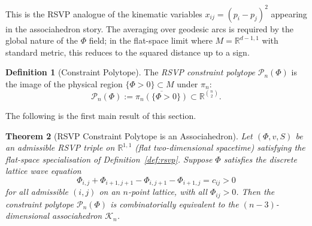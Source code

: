 \documentclass[12pt, oneside]{amsart}
\theoremstyle{plain}
\newtheorem{theorem}{Theorem}[section]
\theoremstyle{definition}
\newtheorem{definition}[theorem]{Definition}
\theoremstyle{remark}
\newcommand{\R}{\mathbb{R}}
\newcommand{\Assoc}{\mathcal{K}_n}
\begin{document}
This is the RSVP analogue of the kinematic variables $x_{ij} = (p_i - p_j)^2$ appearing in the associahedron story. The averaging over geodesic arcs is required by the global nature of the $\Phi$ field; in the flat-space limit where $M = \R^{d-1,1}$ with standard metric, this reduces to the squared distance up to a sign.

\begin{definition}[Constraint Polytope]
\label{def:constraint-polytope}
The \emph{RSVP constraint polytope} $\mathcal{P}_n(\Phi)$ is the image of the physical region $\{\Phi > 0\} \subset M$ under $\pi_n$:
\[
  \mathcal{P}_n(\Phi) := \overline{\pi_n(\{\Phi > 0\})} \subset \R^{\binom{n}{2}}.
\]
\end{definition}

The following is the first main result of this section.

\begin{theorem}[RSVP Constraint Polytope is an Associahedron]
\label{thm:assoc}
Let $(\Phi, v, S)$ be an admissible RSVP triple on $\R^{1,1}$ (flat two-dimensional spacetime) satisfying the flat-space specialisation of Definition~\ref{def:rsvp}. Suppose $\Phi$ satisfies the discrete lattice wave equation
\begin{equation}
\label{eq:lattice-wave}
  \Phi_{i,j} + \Phi_{i+1,j+1} - \Phi_{i,j+1} - \Phi_{i+1,j} = c_{ij} > 0
\end{equation}
for all admissible $(i,j)$ on an $n$-point lattice, with all $\Phi_{ij} > 0$. Then the constraint polytope $\mathcal{P}_n(\Phi)$ is combinatorially equivalent to the $(n-3)$-dimensional associahedron $\Assoc$.
\end{theorem}
\end{document}
